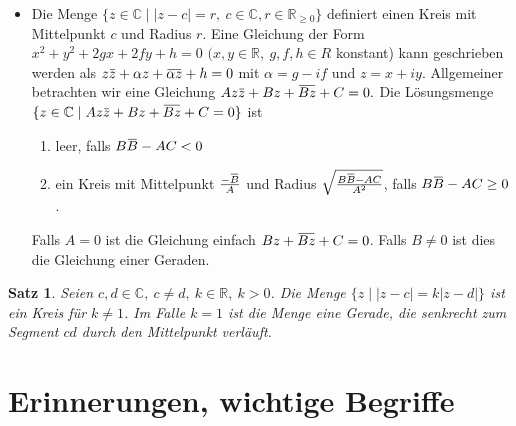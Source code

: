 \documentclass[a4paper,12pt]{book}
\theoremstyle{newthm}
\newtheorem{thm}{Satz}[section]
\theoremstyle{newdef}
\theoremstyle{newrem}
\newcommand{\R}{\mathbb{R}}
\newcommand{\C}{\mathbb{C}}
\newcommand{\overbar}[1]{\mkern 1.5mu\overline{\mkern-1.5mu#1\mkern-1.5mu}\mkern 1.5mu}
\begin{document}
\begin{itemize}
			\item Die Menge $ \{z \in \C \mid |z-c| = r,\ c \in \C, r \in \R_{\geq 0}\} $ definiert einen Kreis mit Mittelpunkt $c$ und Radius $r$. Eine Gleichung der Form $ x^2 + y^2 + 2gx + 2fy + h = 0 $ $ (x,y \in \R,\ g,f,h \in R $ konstant) kann geschrieben werden als $ z \overbar{z} + \alpha z + \overbar{\alpha z} + h=0 $ mit $ \alpha = g-if $ und $ z = x+iy $. Allgemeiner betrachten wir eine Gleichung $ Az\overbar{z} + Bz + \overbar{Bz} + C = 0. $ Die Lösungsmenge $ \{ z \in \C \mid Az\overbar{z} + Bz + \overbar{Bz} + C = 0 \} $ ist
			\begin{enumerate}[label={\roman*})]
				\item leer, falls $ B\overbar{B} - AC < 0 $
				\item ein Kreis mit Mittelpunkt $ \frac{-\overbar{B}}{A} $ und Radius $ \sqrt{\frac{B \overbar{B} - AC}{A^2}} $, falls $ B\overbar{B} - AC \geq 0 $.
			\end{enumerate}
			Falls $A=0$ ist die Gleichung einfach $ Bz + \overbar{Bz} + C = 0 $. Falls $ B \neq 0 $ ist dies die Gleichung einer Geraden.
		\end{itemize}
		
		\begin{thm}
			Seien $ c,d \in \C,\ c \neq d,\ k \in \R,\ k > 0 $. Die Menge $ \{ z \mid |z-c| = k|z-d| \} $ ist ein Kreis für $ k \neq 1 $. Im Falle $ k = 1 $ ist die Menge eine Gerade, die senkrecht zum Segment $ cd $ durch den Mittelpunkt verläuft.
		\end{thm}
		
	
	\section{Erinnerungen, wichtige Begriffe}
		
\end{document}
